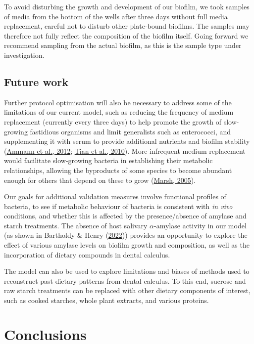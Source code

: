 \documentclass[
  letterpaper,
]{book}
\begin{document}
To avoid disturbing the growth and development of our biofilm, we took
samples of media from the bottom of the wells after three days without
full media replacement, careful not to disturb other plate-bound
biofilms. The samples may therefore not fully reflect the composition of
the biofilm itself. Going forward we recommend sampling from the actual
biofilm, as this is the sample type under investigation.

\hypertarget{future-work}{%
\subsection{Future work}\label{future-work}}

Further protocol optimisation will also be necessary to address some of
the limitations of our current model, such as reducing the frequency of
medium replacement (currently every three days) to help promote the
growth of slow-growing fastidious organisms and limit generalists such
as enterococci, and supplementing it with serum to provide additional
nutrients and biofilm stability
(\protect\hyperlink{ref-ammannZurichBiofilm2012}{Ammann et al., 2012};
\protect\hyperlink{ref-tianUsingDGGE2010}{Tian et al., 2010}). More
infrequent medium replacement would facilitate slow-growing bacteria in
establishing their metabolic relationships, allowing the byproducts of
some species to become abundant enough for others that depend on these
to grow (\protect\hyperlink{ref-marshDentalPlaque2005}{Marsh, 2005}).

Our goals for additional validation measures involve functional profiles
of bacteria, to see if metabolic behaviour of bacteria is consistent
with \emph{in vivo} conditions, and whether this is affected by the
presence/absence of amylase and starch treatments. The absence of host
salivary \(\alpha\)-amylase activity in our model (as shown in Bartholdy
\& Henry
(\protect\hyperlink{ref-bartholdyInvestigatingBiases2022}{2022}))
provides an opportunity to explore the effect of various amylase levels
on biofilm growth and composition, as well as the incorporation of
dietary compounds in dental calculus.

The model can also be used to explore limitations and biases of methods
used to reconstruct past dietary patterns from dental calculus. To this
end, sucrose and raw starch treatments can be replaced with other
dietary components of interest, such as cooked starches, whole plant
extracts, and various proteins.

\hypertarget{conclusions}{%
\section{Conclusions}\label{conclusions}}
\end{document}
